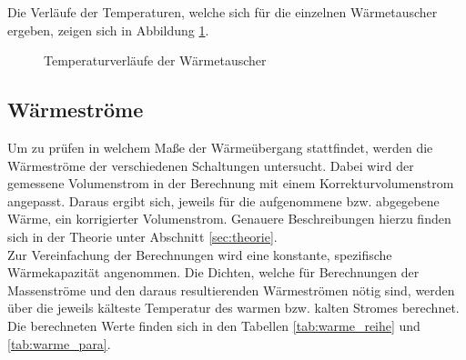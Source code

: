 Die Verläufe der Temperaturen, welche sich für die einzelnen Wärmetauscher ergeben, zeigen sich in Abbildung \ref{dia:temp_profil}.

\vspace*{-7mm}

\begin{figure}[h!]
	\begin{center}
		\caption{Temperaturverläufe der Wärmetauscher}
		\label{dia:temp_profil}
	\end{center}
\end{figure}
\FloatBarrier

\subsection{Wärmeströme}
Um zu prüfen in welchem Maße der Wärmeübergang stattfindet, werden die Wärmeströme der verschiedenen Schaltungen untersucht. Dabei wird der gemessene Volumenstrom in der Berechnung mit einem Korrekturvolumenstrom angepasst. Daraus ergibt sich, jeweils für die aufgenommene bzw. abgegebene Wärme, ein korrigierter Volumenstrom. Genauere Beschreibungen hierzu finden sich in der Theorie unter Abschnitt \ref{sec:theorie}.\\
Zur Vereinfachung der Berechnungen wird eine konstante, spezifische Wärmekapazität angenommen. Die Dichten, welche für Berechnungen der Massenströme und den daraus resultierenden Wärmeströmen nötig sind, werden über die jeweils kälteste Temperatur des warmen bzw. kalten Stromes berechnet.\\
Die berechneten Werte finden sich in den Tabellen \ref{tab:warme_reihe} und \ref{tab:warme_para}.

